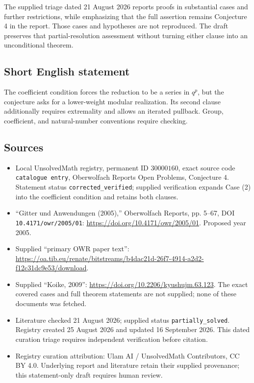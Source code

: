 \documentclass[11pt]{article}
\begin{document}
The supplied triage dated 21 August 2026 reports proofs in substantial cases and further restrictions, while emphasizing that the full assertion remains Conjecture 4 in the report. Those cases and hypotheses are not reproduced. The draft preserves that partial-resolution assessment without turning either clause into an unconditional theorem.
\subsection{Short English statement}
The coefficient condition forces the reduction to be a series in \(q^p\), but the conjecture asks for a lower-weight modular realization. Its second clause additionally requires extremality and allows an iterated pullback. Group, coefficient, and natural-number conventions require checking.
\subsection{Sources}
\begin{itemize}
\item Local UnsolvedMath registry, permanent ID \(30000160\), exact source code \texttt{catalogue entry}, Oberwolfach Reports Open Problems, Conjecture 4. Statement status \texttt{corrected\_verified}; supplied verification expands Case (2) into the coefficient condition and retains both clauses.
\item ``Gitter und Anwendungen (2005),'' Oberwolfach Reports, pp. 5--67, DOI \texttt{10.4171/owr/2005/01}: \url{https://doi.org/10.4171/owr/2005/01}. Proposed year 2005.
\item Supplied ``primary OWR paper text'': \url{https://oa.tib.eu/renate/bitstreams/b4dac21d-26f7-4914-a2d2-f12c31dc9e53/download}.
\item Supplied ``Koike, 2009'': \url{https://doi.org/10.2206/kyushujm.63.123}. The exact covered cases and full theorem statements are not supplied; none of these documents was fetched.
\item Literature checked 21 August 2026; supplied status \texttt{partially\_solved}. Registry created 25 August 2026 and updated 16 September 2026. This dated curation triage requires independent verification before citation.
\item Registry curation attribution: Ulam AI / UnsolvedMath Contributors, CC BY 4.0. Underlying report and literature retain their supplied provenance; this statement-only draft requires human review.
\end{itemize}
\end{document}
